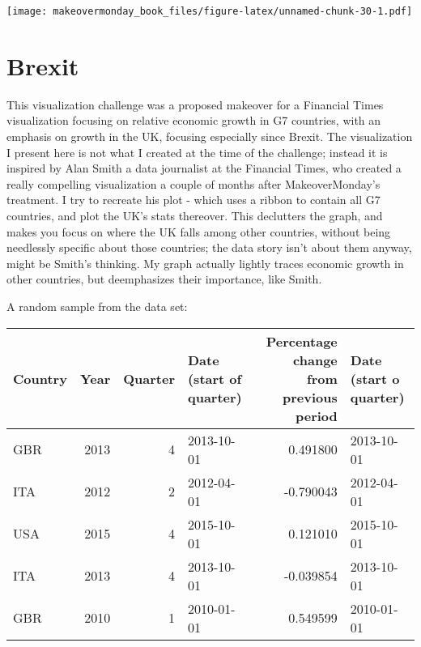 \documentclass[]{book}
\theoremstyle{definition}
\theoremstyle{definition}
\theoremstyle{definition}
\theoremstyle{remark}
\begin{document}
\texttt{[image: makeovermonday\_book\_files/figure-latex/unnamed-chunk-30-1.pdf]}

\chapter{Brexit}\label{brexit}

This visualization challenge was a proposed makeover for a Financial
Times visualization focusing on relative economic growth in G7
countries, with an emphasis on growth in the UK, focusing especially
since Brexit. The visualization I present here is not what I created at
the time of the challenge; instead it is inspired by Alan Smith a data
journalist at the Financial Times, who created a really compelling
visualization a couple of months after MakeoverMonday's treatment. I try
to recreate his plot - which uses a ribbon to contain all G7 countries,
and plot the UK's stats thereover. This declutters the graph, and makes
you focus on where the UK falls among other countries, without being
needlessly specific about those countries; the data story isn't about
them anyway, might be Smith's thinking. My graph actually lightly traces
economic growth in other countries, but deemphasizes their importance,
like Smith.

A random sample from the data set:

\begin{tabular}{l|r|r|l|r|l}
\hline
Country & Year & Quarter & Date (start of quarter) & Percentage change from previous period & Date (start o quarter)\\
\hline
GBR & 2013 & 4 & 2013-10-01 & 0.491800 & 2013-10-01\\
\hline
ITA & 2012 & 2 & 2012-04-01 & -0.790043 & 2012-04-01\\
\hline
USA & 2015 & 4 & 2015-10-01 & 0.121010 & 2015-10-01\\
\hline
ITA & 2013 & 4 & 2013-10-01 & -0.039854 & 2013-10-01\\
\hline
GBR & 2010 & 1 & 2010-01-01 & 0.549599 & 2010-01-01\\
\hline
\end{tabular}
\end{document}
